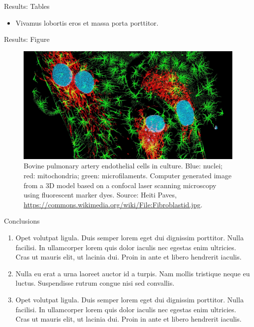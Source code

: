 \documentclass{beamer} %
\begin{document}
\begin{frame}[t]
\begin{columns}[t]
\begin{column}{0.465\textwidth}
\begin{block}{Results: Tables}
	\bigskip\bigskip %
	
	\begin{itemize}
		\item Vivamus lobortis eros et massa porta porttitor.
	\end{itemize}
\end{block}


\begin{block}{Results: Figure}
	\begin{figure}
		\includegraphics[width=\linewidth]{Fibroblastid.jpg}
		\caption{Bovine pulmonary artery endothelial cells in culture. Blue: nuclei; red: mitochondria; green: microfilaments. Computer generated image from a 3D model based on a confocal laser scanning microscopy using fluorescent marker dyes. Source: Heiti Paves, \url{https://commons.wikimedia.org/wiki/File:Fibroblastid.jpg}.}
	\end{figure}
\end{block}


\begin{block}{Conclusions}
	\begin{enumerate}
		\item \alert{Opet volutpat ligula.} Duis semper lorem eget dui dignissim porttitor. Nulla facilisi. In ullamcorper lorem quis dolor iaculis nec egestas enim ultricies. Cras ut mauris elit, ut lacinia dui. Proin in ante et libero hendrerit iaculis.
		\item \alert{Nulla eu erat a urna laoreet auctor id a turpis.} Nam mollis tristique neque eu luctus. Suspendisse rutrum congue nisi sed convallis. 
		\item \alert{Opet volutpat ligula.} Duis semper lorem eget dui dignissim porttitor. Nulla facilisi. In ullamcorper lorem quis dolor iaculis nec egestas enim ultricies. Cras ut mauris elit, ut lacinia dui. Proin in ante et libero hendrerit iaculis.
	\end{enumerate}
\end{block}


\end{column}
\end{columns}
\end{frame}
\end{document}
